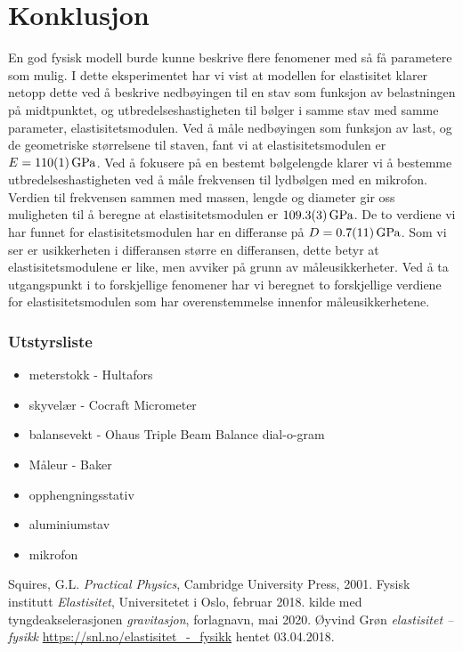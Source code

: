 \documentclass[%
 reprint,
 amsmath,amssymb,
 aps,
 norsk,
 booktabs
]{revtex4-1}
\begin{document}
\section{Konklusjon}
En god fysisk modell burde kunne beskrive flere fenomener med så få parametere som mulig. I dette eksperimentet har vi vist at modellen for elastisitet klarer netopp dette ved å beskrive nedbøyingen til en stav som funksjon av belastningen på midtpunktet, og utbredelseshastigheten til bølger i samme stav med samme parameter, elastisitetsmodulen.
Ved å måle nedbøyingen som funksjon av last, og de geometriske størrelsene til staven, fant vi at elastisitetsmodulen er $E=\SI{110\pm1}{\giga\pascal}$.
Ved å fokusere på en bestemt bølgelengde klarer vi å bestemme utbredelseshastigheten ved å måle frekvensen til lydbølgen med en mikrofon. Verdien til frekvensen sammen med massen, lengde og diameter gir oss muligheten til å beregne at elastisitetsmodulen er $\SI{109.3\pm0.3}{\giga\pascal}$.
De to verdiene vi har funnet for elastisitetsmodulen har en differanse på $D = \SI{0.7\pm1.1}{\giga\pascal}$. Som vi ser er usikkerheten i differansen større en differansen, dette betyr at elastisitetsmodulene er like, men avviker på grunn av måleusikkerheter. Ved å ta utgangspunkt i to forskjellige fenomener har vi beregnet to forskjellige verdiene for elastisitetsmodulen som har overenstemmelse innenfor måleusikkerhetene.
\subsubsection*{Utstyrsliste}
\begin{itemize}
\label{utstyr}
\item meterstokk - Hultafors
\item skyvelær - Cocraft Micrometer
\item balansevekt - Ohaus Triple Beam Balance dial-o-gram
\item Måleur - Baker
\item opphengningsstativ
\item aluminiumstav
\item mikrofon
\end{itemize}
\begin{thebibliography}{9}
Squires, G.L. \emph{Practical Physics}, Cambridge University Press, 2001.
Fysisk institutt \emph{Elastisitet}, Universitetet i Oslo, februar 2018.
kilde med tyngdeakselerasjonen \emph{gravitasjon}, forlagnavn, mai 2020.
Øyvind Grøn \emph{elastisitet – fysikk} \url{https://snl.no/elastisitet_-_fysikk} hentet 03.04.2018.
\end{thebibliography}
\end{document}
